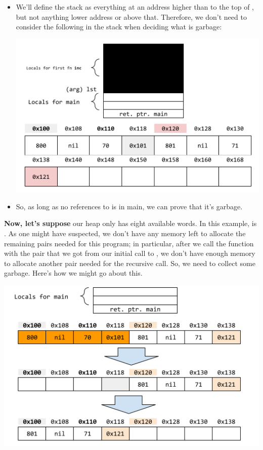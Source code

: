 \begin{itemize}
    \item We'll define the stack as everything at an address higher than  to the top of , but not anything lower address or above that. Therefore, we don't need to consider the following in the stack when deciding what is garbage: 
    \begin{center}
        \includegraphics[scale=0.5]{assets/stackHeapPairGC3.png}
    \end{center}

    \item So, as long as no references to  is in main, we can prove that it's garbage.
\end{itemize}
\textbf{Now, let's suppose} our heap only has eight available words. In this example,  is . As one might have suspected, we don't have any memory left to allocate the remaining pairs needed for this program; in particular, after we call the  function with the pair that we got from our initial call to , we don't have enough memory to allocate another pair needed for the recursive call. So, we need to collect some garbage. Here's how we might go about this. 
\begin{center}
    \includegraphics[scale=0.7]{assets/stackHeapPairGCFix4.png}
\end{center}
